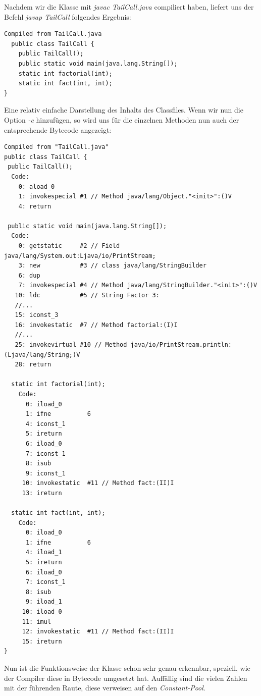 \documentclass[a4paper, 11pt]{article}
\begin{document}
	Nachdem wir die Klasse mit \textit{javac TailCall.java} compiliert haben, liefert uns der Befehl \textit{javap TailCall} folgendes Ergebnis:
\begin{lstlisting}
Compiled from TailCall.java
  public class TailCall {
    public TailCall();
    public static void main(java.lang.String[]);
    static int factorial(int);
    static int fact(int, int);
}
\end{lstlisting}
 Eine relativ einfache Darstellung des Inhalts des Classfiles. Wenn wir nun die Option \textit{-c} hinzufügen, so wird uns für die einzelnen Methoden nun auch der entsprechende Bytecode angezeigt:
 
 \lstset{language=JVMIS}
 \begin{lstlisting}
Compiled from "TailCall.java"
public class TailCall {
 public TailCall();
  Code:
    0: aload_0
    1: invokespecial #1 // Method java/lang/Object."<init>":()V
    4: return

 public static void main(java.lang.String[]);
  Code:
    0: getstatic     #2 // Field java/lang/System.out:Ljava/io/PrintStream;
    3: new           #3 // class java/lang/StringBuilder
    6: dup
    7: invokespecial #4 // Method java/lang/StringBuilder."<init>":()V
   10: ldc           #5 // String Factor 3:
   //...
   15: iconst_3
   16: invokestatic  #7 // Method factorial:(I)I
   //...
   25: invokevirtual #10 // Method java/io/PrintStream.println:(Ljava/lang/String;)V
   28: return

  static int factorial(int);
    Code:
      0: iload_0
      1: ifne          6
      4: iconst_1
      5: ireturn
      6: iload_0
      7: iconst_1
      8: isub
      9: iconst_1
     10: invokestatic  #11 // Method fact:(II)I
     13: ireturn

  static int fact(int, int);
    Code:
      0: iload_0
      1: ifne          6
      4: iload_1
      5: ireturn
      6: iload_0
      7: iconst_1
      8: isub
      9: iload_1
     10: iload_0
     11: imul
     12: invokestatic  #11 // Method fact:(II)I
     15: ireturn
}
 \end{lstlisting}
	Nun ist die Funktionsweise der Klasse schon sehr genau erkennbar, speziell, wie der Compiler diese in Bytecode umgesetzt hat.
	Auffällig sind die vielen Zahlen mit der führenden Raute, diese verweisen auf den \textit{Constant-Pool}.
	
\end{document}
